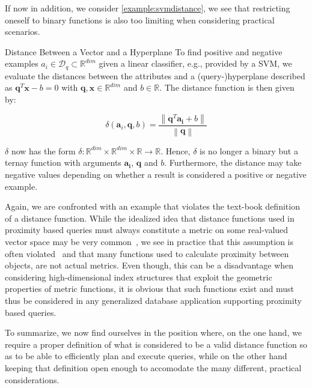 If now in addition, we consider \cref{example:svmdistance}, we see that restricting oneself to binary functions is also too limiting when considering practical scenarios.

\begin{example}[label=example:svmdistance]{Distance Between a Vector and a Hyperplane}{}
    To find positive and negative examples $a_{i} \in \mathcal{D}_q \subset \mathbb{R}^{dim}$ given a linear classifier, e.g., provided by a SVM, we evaluate the distances between the attributes and a (query-)hyperplane described as $\mathbf{q}^T\mathbf{x} - b = 0$ with $\mathbf{q},\mathbf{x} \in \mathbb{R}^{dim}$ and $b \in \mathbb{R}$. The distance function is then given by:

    \begin{equation}
        \delta (\mathbf{a}_i, \mathbf{q}, b) = \frac{\left\|\mathbf{q}^T \mathbf{a_i} + b \right\|}{\left\|\mathbf{q}\right\|}
    \end{equation}
    
    $\delta$ now has the form $\delta \colon \mathbb{R}^{dim} \times \mathbb{R}^{dim} \times \mathbb{R} \to \mathbb{R}$. Hence, $\delta$ is no longer a binary but a ternay function with arguments $\mathbf{a_{i}}$, $\mathbf{q}$ and $b$. Furthermore, the distance may take negative values depending on whether a result is considered a positive or negative example.
\end{example}


Again, we are confronted with an example that violates the text-book definition of a distance function. While the idealized idea that distance functions used in proximity based queries must always constitute a metric on some real-valued vector space may be very common~\cite{Zezula:2006similarity}, we see in practice that this assumption is often violated~\cite{Bernhauer:2019Nonmetric}  and that many functions used to calculate proximity between objects, are not actual metrics. Even though, this can be a disadvantage when considering high-dimensional index structures that exploit the geometric properties of metric functions, it is obvious that such functions exist and must thus be considered in any generalized database application supporting proximity based queries. 

To summarize, we now find ourselves in the position where, on the one hand, we require a proper definition of what is considered to be a valid distance function so as to be able to efficiently plan and execute queries, while on the other hand keeping that definition open enough to accomodate the many different, practical considerations.


